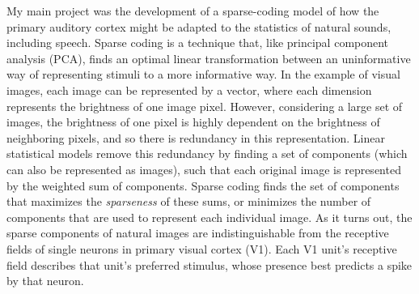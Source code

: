 \documentclass[12pt]{article}
\begin{document}
My main project was the development of a sparse-coding model of how the primary auditory cortex might be adapted to the statistics of natural sounds, including speech.  Sparse coding is a technique that, like principal component analysis (PCA), finds an optimal linear transformation between an uninformative way of representing stimuli to a more informative way.  In the example of visual images, each image can be represented by a vector, where each dimension represents the brightness of one image pixel.  However, considering a large set of images, the brightness of one pixel is highly dependent on the brightness of neighboring pixels, and so there is redundancy in this representation.  Linear statistical models remove this redundancy by finding a set of components (which can also be represented as images), such that each original image is represented by the weighted sum of components.  Sparse coding finds the set of components that maximizes the \emph{sparseness} of these sums, or minimizes the number of components that are used to represent each individual image.  As it turns out, the sparse components of natural images are indistinguishable from the receptive fields of single neurons in primary visual cortex (V1).  Each V1 unit's receptive field describes that unit's preferred stimulus, whose presence best predicts a spike by that neuron.





\end{document}
